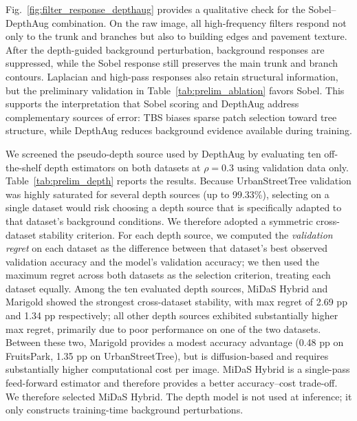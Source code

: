 \documentclass{ieeeaccess}
\begin{document}
Fig.~\ref{fig:filter_response_depthaug} provides a qualitative check for the Sobel--DepthAug
combination. On the raw image, all high-frequency filters respond not only to the trunk and branches
but also to building edges and pavement texture. After the depth-guided background perturbation,
background responses are suppressed, while the Sobel response still preserves the main trunk and
branch contours. Laplacian and high-pass responses also retain structural information, but the
preliminary validation in Table~\ref{tab:prelim_ablation} favors Sobel. This supports the
interpretation that Sobel scoring and DepthAug address complementary sources of error: TBS biases
sparse patch selection toward tree structure, while DepthAug reduces background evidence available
during training.

We screened the pseudo-depth source used by DepthAug by evaluating ten off-the-shelf depth
estimators on both datasets at $\rho=0.3$ using validation data only. Table~\ref{tab:prelim_depth}
reports the results. Because UrbanStreetTree validation was highly saturated for several depth
sources (up to 99.33\%), selecting on a single dataset would risk choosing a depth source that is
specifically adapted to that dataset's background conditions. We therefore adopted a symmetric
cross-dataset stability criterion. For each depth source, we computed the \emph{validation regret}
on each dataset as the difference between that dataset's best observed validation accuracy and the
model's validation accuracy; we then used the maximum regret across both datasets as the selection
criterion, treating each dataset equally. Among the ten evaluated depth sources, MiDaS Hybrid and
Marigold showed the strongest cross-dataset stability, with max regret of 2.69 pp and 1.34 pp
respectively; all other depth sources exhibited substantially higher max regret, primarily due to
poor performance on one of the two datasets. Between these two, Marigold provides a modest accuracy
advantage (0.48 pp on FruitsPark, 1.35 pp on UrbanStreetTree), but is diffusion-based and requires
substantially higher computational cost per image. MiDaS Hybrid is a single-pass feed-forward
estimator and therefore provides a better accuracy--cost trade-off. We therefore selected MiDaS
Hybrid. The depth model is not used at inference; it only constructs training-time background
perturbations.
\end{document}
